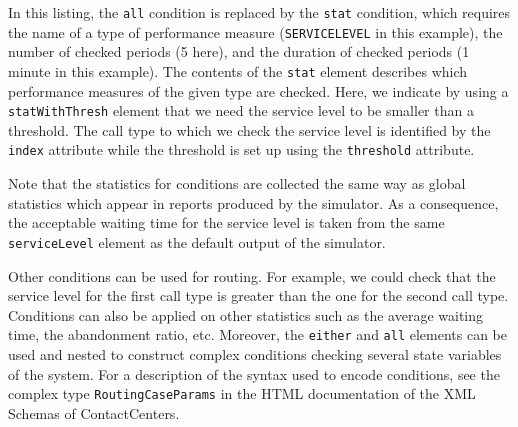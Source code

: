 In this listing,
the \texttt{all} condition is replaced by the \texttt{stat} condition,
which requires the name of a type of performance measure
(\texttt{SERVICELEVEL} in this example), the number of checked
periods (5 here), and the duration of checked periods (1 minute in
this example). The contents of the \texttt{stat}
 element describes which performance
measures of the given type are checked.
Here, we indicate by using a \texttt{stat\-With\-Thresh} element
that we need the service level to be smaller than a
threshold.
The call type to which we check the service level is identified by the
\texttt{index} attribute while the threshold is set up using the
\texttt{threshold} attribute.

Note that the statistics for conditions are collected the same way as
global statistics which appear in reports produced by the simulator.
As a consequence, the acceptable waiting time for the service level is
taken from the same \texttt{service\-Level} element as the default
output of the simulator.

Other conditions can be used for routing.
For example, we could check that the service level for the first call
type is greater than the one for the second call type.
Conditions can also be applied on other statistics such as the average
waiting time, the abandonment ratio, etc.
Moreover, the \texttt{either} and \texttt{all} elements can be used
and nested to construct complex conditions checking several state
variables of the system.
For a description of the syntax used to encode conditions,
see the complex type \texttt{Routing\-Case\-Params} in the
HTML documentation of the XML Schemas of ContactCenters.

